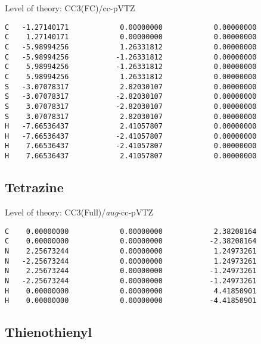 \documentclass[journal=jctcce,manuscript=article,layout=traditional]{achemso}
\newcommand{\TZ}{cc-pVTZ}
\newcommand{\AVTZ}{\emph{aug}-cc-pVTZ}
\begin{document}
\begin{singlespace}
Level of theory: CC3(FC)/{\TZ}
\begin{verbatim}
C   -1.27140171            0.00000000            0.00000000
C    1.27140171            0.00000000            0.00000000
C   -5.98994256            1.26331812            0.00000000
C   -5.98994256           -1.26331812            0.00000000
C    5.98994256           -1.26331812            0.00000000
C    5.98994256            1.26331812            0.00000000
S   -3.07078317            2.82030107            0.00000000
S   -3.07078317           -2.82030107            0.00000000
S    3.07078317           -2.82030107            0.00000000
S    3.07078317            2.82030107            0.00000000
H   -7.66536437            2.41057807            0.00000000
H   -7.66536437           -2.41057807            0.00000000
H    7.66536437           -2.41057807            0.00000000
H    7.66536437            2.41057807            0.00000000
\end{verbatim}
\end{singlespace}

\subsection*{Tetrazine}

\begin{singlespace}
Level of theory: CC3(Full)/{\AVTZ}
\begin{verbatim}
C    0.00000000            0.00000000            2.38208164
C    0.00000000            0.00000000           -2.38208164
N    2.25673244            0.00000000            1.24973261
N   -2.25673244            0.00000000            1.24973261
N    2.25673244            0.00000000           -1.24973261
N   -2.25673244            0.00000000           -1.24973261
H    0.00000000            0.00000000            4.41850901
H    0.00000000            0.00000000           -4.41850901
\end{verbatim}
\end{singlespace}

\subsection*{Thienothienyl}
\end{document}
